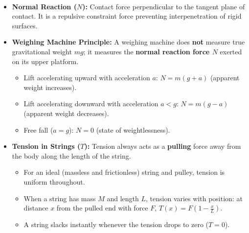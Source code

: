 \documentclass[11pt,a4paper]{article}
\begin{document}
\vspace{5pt}
\noindent{\large\textbf{\textsf{\textcolor{primaryDark}{1.2 Contact Forces: Normal, Tension, and Spring Systems}}}}\\[3pt]
\begin{itemize}[leftmargin=14pt,itemsep=2.5pt]
  \item \textbf{Normal Reaction ($N$):} Contact force perpendicular to the tangent plane of contact. It is a repulsive constraint force preventing interpenetration of rigid surfaces.
  \item \textbf{Weighing Machine Principle:} A weighing machine does \textbf{not} measure true gravitational weight $mg$; it measures the \textbf{normal reaction force $N$} exerted on its upper platform.
  \begin{itemize}[leftmargin=12pt,itemsep=1pt]
    \item Lift accelerating upward with acceleration $a$: $N = m(g + a)$ (apparent weight increases).
    \item Lift accelerating downward with acceleration $a < g$: $N = m(g - a)$ (apparent weight decreases).
    \item Free fall ($a = g$): $N = 0$ (state of weightlessness).
  \end{itemize}
  \item \textbf{Tension in Strings ($T$):} Tension always acts as a \textbf{pulling} force away from the body along the length of the string.
  \begin{itemize}[leftmargin=12pt,itemsep=1pt]
    \item For an ideal (massless and frictionless) string and pulley, tension is uniform throughout.
    \item When a string has mass $M$ and length $L$, tension varies with position: at distance $x$ from the pulled end with force $F$, $T(x) = F\left(1 - \frac{x}{L}\right)$.
    \item A string slacks instantly whenever the tension drops to zero ($T = 0$).
  \end{itemize}
\end{itemize}
\end{document}

